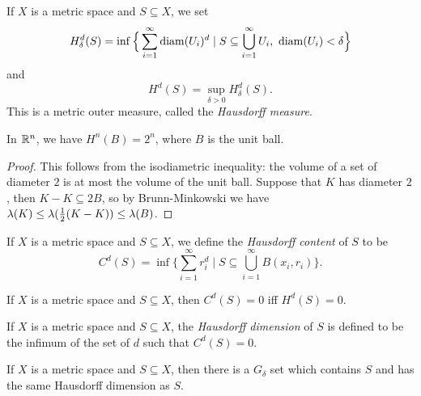 \begin{defn} If $X$ is a metric space and $S \subseteq X$, we set
\[
H^d_\delta(S) = \inf\Big\{\sum_{i=1}^\infty \operatorname{diam}(U_i)^d \mid S \subseteq \bigcup_{i=1}^\infty U_i,\ \operatorname{diam}(U_i) < \delta\Big\}
\]
and
\[
H^d(S) = \sup_{\delta > 0} H^d_\delta(S).
\]
This is a metric outer measure, called the \emph{Hausdorff measure}.
\end{defn}

\begin{thm} In $\mathbb{R}^n$, we have $H^n(B) = 2^n$, where $B$ is the unit ball.
\end{thm}
\begin{proof} This follows from the isodiametric inequality: the volume of a set of diameter $2$ is at most the volume of the unit ball. Suppose that $K$ has diameter $2$, then $K-K \subseteq 2B$, so by Brunn-Minkowski we have $\lambda(K) \le \lambda(\frac{1}{2}(K-K)) \le \lambda(B)$.
\end{proof}

\begin{defn} If $X$ is a metric space and $S \subseteq X$, we define the \emph{Hausdorff content} of $S$ to be
\[
C^d(S) = \inf\Big\{\sum_{i=1}^\infty r_i^d \mid S \subseteq \bigcup_{i=1}^\infty B(x_i,r_i)\Big\}.
\]
\end{defn}

\begin{prop} If $X$ is a metric space and $S \subseteq X$, then $C^d(S) = 0$ iff $H^d(S) = 0$.
\end{prop}

\begin{defn} If $X$ is a metric space and $S \subseteq X$, the \emph{Hausdorff dimension} of $S$ is defined to be the infimum of the set of $d$ such that $C^d(S) = 0$.
\end{defn}

\begin{prop} If $X$ is a metric space and $S \subseteq X$, then there is a $G_\delta$ set which contains $S$ and has the same Hausdorff dimension as $S$.
\end{prop}


